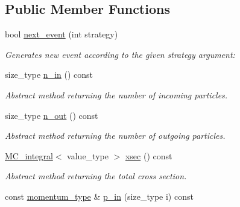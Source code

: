 \subsection*{Public Member Functions}
\begin{DoxyCompactItemize}
\item 
\hypertarget{a00529_afc3b1ccf6c6aa0aa18847cda5f9f17fa}{bool \hyperlink{a00529_afc3b1ccf6c6aa0aa18847cda5f9f17fa}{next\-\_\-event} (int strategy)}\label{a00529_afc3b1ccf6c6aa0aa18847cda5f9f17fa}

\begin{DoxyCompactList}\small\item\em Generates new event according to the given strategy argument\-: \end{DoxyCompactList}\item 
\hypertarget{a00529_ab4ab1dab3151f985f0957fce56382c2c}{size\-\_\-type \hyperlink{a00529_ab4ab1dab3151f985f0957fce56382c2c}{n\-\_\-in} () const }\label{a00529_ab4ab1dab3151f985f0957fce56382c2c}

\begin{DoxyCompactList}\small\item\em Abstract method returning the number of incoming particles. \end{DoxyCompactList}\item 
\hypertarget{a00529_ab1772344831cd5519da309cd6d7b1c99}{size\-\_\-type \hyperlink{a00529_ab1772344831cd5519da309cd6d7b1c99}{n\-\_\-out} () const }\label{a00529_ab1772344831cd5519da309cd6d7b1c99}

\begin{DoxyCompactList}\small\item\em Abstract method returning the number of outgoing particles. \end{DoxyCompactList}\item 
\hypertarget{a00529_ae7f9a6b11942ebabd0d62ea83da4d0d7}{\hyperlink{a00363}{M\-C\-\_\-integral}$<$ value\-\_\-type $>$ \hyperlink{a00529_ae7f9a6b11942ebabd0d62ea83da4d0d7}{xsec} () const }\label{a00529_ae7f9a6b11942ebabd0d62ea83da4d0d7}

\begin{DoxyCompactList}\small\item\em Abstract method returning the total cross section. \end{DoxyCompactList}\item 
\hypertarget{a00529_a318df8eae867966ec8e6b0253495fbea}{const \hyperlink{a00559}{momentum\-\_\-type} \& \hyperlink{a00529_a318df8eae867966ec8e6b0253495fbea}{p\-\_\-in} (size\-\_\-type i) const }\label{a00529_a318df8eae867966ec8e6b0253495fbea}


\end{DoxyCompactItemize}
